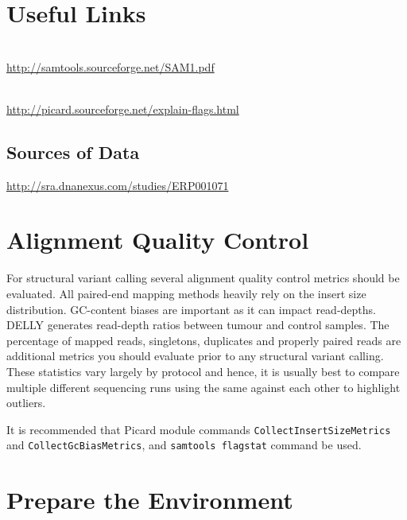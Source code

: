\section{Useful Links}
 
\begin{description}[style=multiline,labelindent=0cm,align=left,leftmargin=0.5cm]
  \item[SAM Specification]\hfill\\
    \url{http://samtools.sourceforge.net/SAM1.pdf}
  \item[Explain SAM Flags]\hfill\\
    \url{http://picard.sourceforge.net/explain-flags.html}
\end{description}

\subsection{Sources of Data}
  \url{http://sra.dnanexus.com/studies/ERP001071}

\clearpage

\section{Alignment Quality Control}

\begin{information}
For structural variant calling several alignment quality control metrics should be evaluated. All paired-end mapping methods heavily rely on the insert size distribution. GC-content biases are important as it can impact read-depths. DELLY generates read-depth ratios between tumour and control samples. The percentage of mapped reads, singletons, duplicates and properly paired reads are additional metrics you should evaluate prior to any structural variant calling. These statistics vary largely by protocol and hence, it is usually best to compare multiple different sequencing runs using the same against each other to highlight outliers. 

It is recommended that Picard module commands \texttt{CollectInsertSizeMetrics} and \texttt{CollectGcBiasMetrics}, and \texttt{samtools flagstat} command be used. 

\end{information}

\section{Prepare the Environment}


